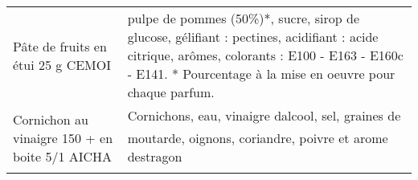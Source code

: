 \begin{longtable}{p{5cm}p{10cm}}
                                                                        Pâte de fruits en étui 25 g CEMOI &                                                                                                                                                                                                                                                                                                                                                                                                                                                                                                                                                                                                                                                                                                                                                                                                                               pulpe de pommes (50\%)*, sucre, sirop de glucose, gélifiant : pectines, acidifiant : acide citrique, arômes, colorants : E100 - E163 - E160c - E141.  * Pourcentage à la mise en oeuvre pour chaque parfum. \\
                                                           Cornichon au vinaigre 150 + en boite 5/1 AICHA &                                                                                                                                                                                                                                                                                                                                                                                                                                                                                                                                                                                                                                                                                                                                                                                                                                                                                                                             Cornichons, eau, vinaigre dalcool, sel, graines de moutarde, oignons, coriandre, poivre et arome destragon \\

\end{longtable}
